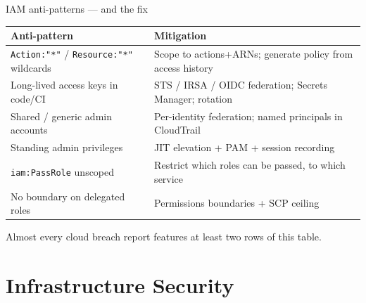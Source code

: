 \documentclass[aspectratio=169,10pt]{beamer}
\newcommand{\cmark}{\textcolor{good}{\ding{51}}}
\newcommand{\xmark}{\textcolor{bad}{\ding{55}}}
\begin{document}
\begin{frame}{IAM anti-patterns --- and the fix}
  \centering\small
  \renewcommand{\arraystretch}{1.3}
  \begin{tabular}{>{\raggedright\arraybackslash}p{5.2cm} >{\raggedright\arraybackslash}p{6.6cm}}
    \toprule
    \textbf{Anti-pattern \xmark} & \textbf{Mitigation \cmark}\\
    \midrule
    \texttt{Action:"*"} / \texttt{Resource:"*"} wildcards & Scope to actions+ARNs; generate policy from access history\\
    Long-lived access keys in code/CI & STS / IRSA / OIDC federation; Secrets Manager; rotation\\
    Shared / generic admin accounts & Per-identity federation; named principals in CloudTrail\\
    Standing admin privileges & JIT elevation + PAM + session recording\\
    \texttt{iam:PassRole} unscoped & Restrict which roles can be passed, to which service\\
    No boundary on delegated roles & Permissions boundaries + SCP ceiling\\
    \bottomrule
  \end{tabular}
  \vfill
  {\footnotesize\color{midgray}Almost every cloud breach report features at least two rows of this table.}
\end{frame}

\section{Infrastructure Security}
\end{document}
